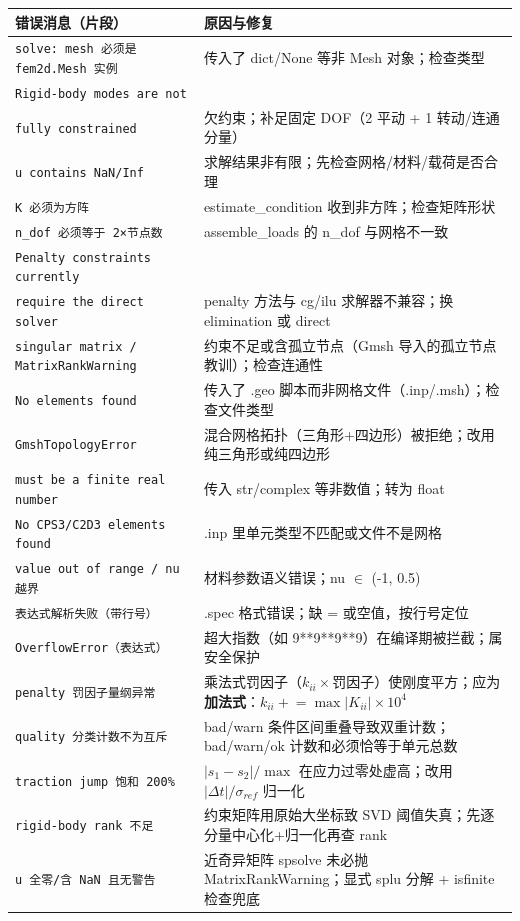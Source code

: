 \documentclass[12pt,a4paper]{ctexart}
\newcommand{\fem}{\Verb}
\begin{document}
\begin{longtable}{p{7.4cm}p{7.7cm}}
\toprule
\textbf{错误消息（片段）} & \textbf{原因与修复} \\
\midrule
\fem|solve: mesh 必须是 fem2d.Mesh 实例| & 传入了 dict/None 等非 Mesh 对象；检查类型 \\
\texttt{Rigid-body modes are not}\\ \texttt{fully constrained} & 欠约束；补足固定 DOF（2 平动 + 1 转动/连通分量） \\
\fem|u contains NaN/Inf| & 求解结果非有限；先检查网格/材料/载荷是否合理 \\
\fem|K 必须为方阵| & estimate\_condition 收到非方阵；检查矩阵形状 \\
\fem|n_dof 必须等于 2×节点数| & assemble\_loads 的 n\_dof 与网格不一致 \\
\texttt{Penalty constraints currently}\\ \texttt{require the direct solver} & penalty 方法与 cg/ilu 求解器不兼容；换 elimination 或 direct \\
\fem|singular matrix / MatrixRankWarning| & 约束不足或含孤立节点（Gmsh 导入的孤立节点教训）；检查连通性 \\
\fem|No elements found| & 传入了 .geo 脚本而非网格文件（.inp/.msh）；检查文件类型 \\
\fem|GmshTopologyError| & 混合网格拓扑（三角形+四边形）被拒绝；改用纯三角形或纯四边形 \\
\fem|must be a finite real number| & 传入 str/complex 等非数值；转为 float \\
\fem|No CPS3/C2D3 elements found| & .inp 里单元类型不匹配或文件不是网格 \\
\fem|value out of range / nu 越界| & 材料参数语义错误；nu $\in$ (-1, 0.5) \\
\fem|表达式解析失败（带行号）| & .spec 格式错误；缺 = 或空值，按行号定位 \\
\fem|OverflowError（表达式）| & 超大指数（如 9**9**9**9）在编译期被拦截；属安全保护 \\
\texttt{penalty 罚因子量纲异常} & 乘法式罚因子（$k_{ii}\times$罚因子）使刚度平方；应为\textbf{加法式}：$k_{ii} \mathrel{+}= \max|K_{ii}|\times 10^4$ \\
\texttt{quality 分类计数不为互斥} & bad/warn 条件区间重叠导致双重计数；bad/warn/ok 计数和必须恰等于单元总数 \\
\texttt{traction jump 饱和 200\%} & $|s_1-s_2|/\max$ 在应力过零处虚高；改用 $|\Delta t|/\sigma_{ref}$ 归一化 \\
\texttt{rigid-body rank 不足} & 约束矩阵用原始大坐标致 SVD 阈值失真；先逐分量中心化+归一化再查 rank \\
\texttt{u 全零/含 NaN 且无警告} & 近奇异矩阵 spsolve 未必抛 MatrixRankWarning；显式 splu 分解 + isfinite 检查兜底 \\
\bottomrule
\end{longtable}
\end{document}
